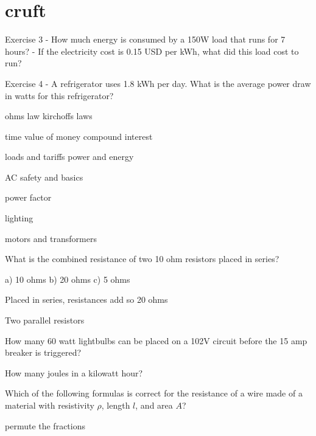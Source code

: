 \documentclass[12pt, oneside]{article}
\begin{document}
\newpage
\section{cruft}

Exercise 3
- How much energy is consumed by a 150W load that runs for 7 hours?
- If the electricity cost is 0.15 USD per kWh, what did this load cost to run?

Exercise 4
- A refrigerator uses 1.8 kWh per day.  What is the average power draw
  in watts for this refrigerator?



ohms law kirchoffs laws


time value of money
compound interest


loads and tariffs
power and energy


AC
safety and basics


power factor


lighting


motors and transformers






What is the combined resistance of two 10 ohm resistors placed in
series?

a) 10 ohms
b) 20 ohms
c) 5 ohms


Placed in series, resistances add so 20 ohms


Two parallel resistors



How many 60 watt lightbulbs can be placed on a 102V circuit before the 15 amp
breaker is triggered?


How many joules in a kilowatt hour?


Which of the following formulas is correct for the resistance of a wire
made of a material with resistivity $\rho$, length $l$, and area $A$?

permute the fractions
\end{document}
